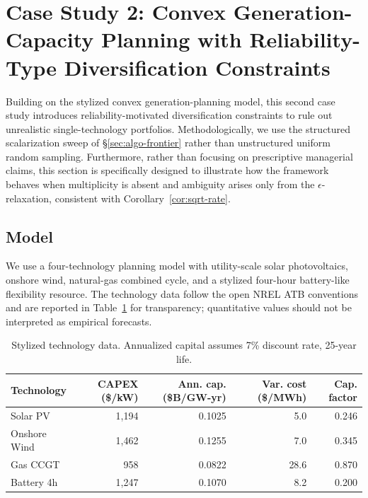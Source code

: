 \documentclass[11pt]{article}
\theoremstyle{definition}
\newcommand{\eps}{\epsilon}
\begin{document}
\section{Case Study 2: Convex Generation-Capacity Planning with
Reliability-Type Diversification Constraints}
\label{sec:case2}
Building on the stylized convex generation-planning model, this second case study introduces reliability-motivated diversification constraints to rule out unrealistic single-technology portfolios.
Methodologically, we use the structured scalarization sweep of
\S\ref{sec:algo-frontier} rather than unstructured uniform random
sampling. 
Furthermore, rather than focusing on prescriptive managerial claims, 
this section is specifically designed to illustrate how the framework behaves
when multiplicity is absent and ambiguity arises only from the
$\eps$-relaxation, consistent with Corollary~\ref{cor:sqrt-rate}.

\subsection{Model}
We use a four-technology planning model with utility-scale solar
photovoltaics, onshore wind, natural-gas combined cycle, and a
stylized four-hour battery-like flexibility resource. The
technology data follow the open NREL ATB conventions and are
reported in Table~\ref{tab:techdata} for transparency;
quantitative values should not be interpreted as empirical
forecasts.

\begin{table}[ht]
\centering
\caption{Stylized technology data. Annualized capital assumes 7\%
discount rate, 25-year life.}
\label{tab:techdata}
\small
\begin{tabular}{@{}lrrrr@{}}
\toprule
Technology & CAPEX (\$/kW) & Ann. cap. (\$B/GW-yr) &
Var. cost (\$/MWh) & Cap. factor\\
\midrule
Solar PV     & 1{,}194 & 0.1025 &  5.0 & 0.246\\
Onshore Wind & 1{,}462 & 0.1255 &  7.0 & 0.345\\
Gas CCGT     &   958 & 0.0822 & 28.6 & 0.870\\
Battery 4h   & 1{,}247 & 0.1070 &  8.2 & 0.200\\
\bottomrule
\end{tabular}
\end{table}
\end{document}
